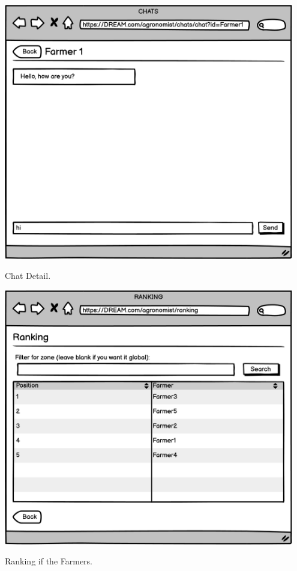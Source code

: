 \vspace{0.5cm}
\begin{minipage}{.5\textwidth}
	\centering
	\includegraphics[width=0.95\textwidth]{Images/Mockup/Agronomist/17AgronomistChatFarmer1.png}
	\captionsetup{type=figure}
	\caption{Chat Detail.}
\end{minipage}%
\begin{minipage}{.5\textwidth}
	\centering
	\includegraphics[width=0.95\textwidth]{Images/Mockup/Agronomist/18AgronomistRanking.png}
	\captionsetup{type=figure}
	\caption{Ranking if the Farmers.}
\end{minipage}

